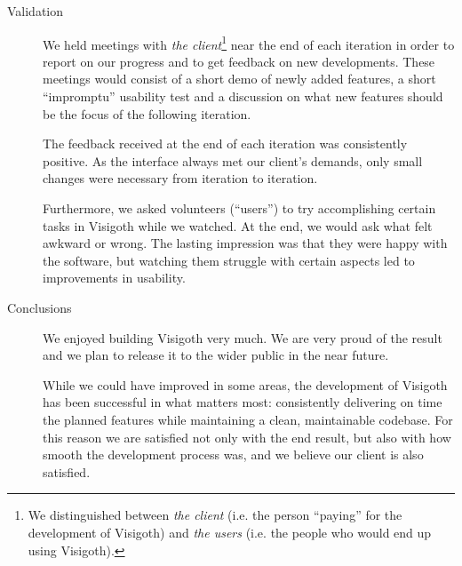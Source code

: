 \documentclass[a4paper,11pt]{article}
\begin{document}
\begin{description}
\item[Validation]

  We held meetings with \emph{the client}\footnote{We distinguished
    between \emph{the client} (i.e.  the person ``paying'' for the
    development of Visigoth) and \emph{the users} (i.e. the people who
    would end up using Visigoth).} near the end of each iteration in
  order to report on our progress and to get feedback on new
  developments. These meetings would consist of a short demo of newly
  added features, a short ``impromptu'' usability test and a
  discussion on what new features should be the focus of the following
  iteration.

  The feedback received at the end of each iteration was consistently
  positive. As the interface always met our client's demands, only
  small changes were necessary from iteration to iteration.

  Furthermore, we asked volunteers (``users'') to try accomplishing
  certain tasks in Visigoth while we watched. At the end, we would ask
  what felt awkward or wrong. The lasting impression was that they
  were happy with the software, but watching them struggle with
  certain aspects led to improvements in usability.

\item[Conclusions]

  We enjoyed building Visigoth very much. We are very proud of the
  result and we plan to release it to the wider public in the near
  future.

  While we could have improved in some areas, the development of
  Visigoth has been successful in what matters most: consistently
  delivering on time the planned features while maintaining a clean,
  maintainable codebase. For this reason we are satisfied not only
  with the end result, but also with how smooth the development
  process was, and we believe our client is also satisfied.

\end{description}
\end{document}
